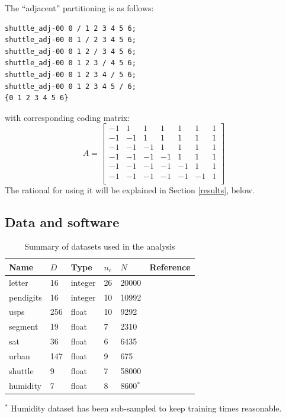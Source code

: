 The ``adjacent'' partitioning is as follows:
\begin{verbatim}
shuttle_adj-00 0 / 1 2 3 4 5 6;
shuttle_adj-00 0 1 / 2 3 4 5 6;
shuttle_adj-00 0 1 2 / 3 4 5 6;
shuttle_adj-00 0 1 2 3 / 4 5 6;
shuttle_adj-00 0 1 2 3 4 / 5 6;
shuttle_adj-00 0 1 2 3 4 5 / 6;
{0 1 2 3 4 5 6}
\end{verbatim}
with corresponding coding matrix:
\begin{equation}
A = 
\begin{bmatrix}
-1 & 1 & 1 & 1 & 1 & 1 & 1 \\
-1 & -1 & 1 & 1 & 1 & 1 & 1 \\
-1 & -1 & -1 & 1 & 1 & 1 & 1 \\
-1 & -1 & -1 & -1 & 1 & 1 & 1 \\
-1 & -1 & -1 & -1 & -1 & 1 & 1 \\
-1 & -1 & -1 & -1 & -1 & -1 & 1 \\
\end{bmatrix}
	\label{adjacent}
\end{equation}
The rational for using it will be explained in Section \ref{results}, below.

\subsection{Data and software}

\label{data_and_software}

\begin{table}
	\caption{Summary of datasets used in the analysis}\label{datasets}
	\begin{tabular}{|l|lllll|}
	\hline
	Name & $D$ & Type & $n_c$ & $N$ & Reference \\\hline \hline
	letter &  16 & integer & 26 & 20000 & {\small \citep{Frey_Slate1991}}\\
	pendigits & 16 & integer & 10 & 10992 & {\small \citep{Alimoglu1996}}\\
	usps & 256 & float & 10 & 9292 & {\small \citep{Hull1994}}\\
	segment & 19 & float & 7 & 2310 & {\small \citep{King_etal1995}} \\
	sat & 36 & float & 6 & 6435 & {\small \citep{King_etal1995}}\\
	urban & 147 & float & 9 & 675 & {\small \citep{Johnson2013}} \\
	shuttle & 9 & float & 7 & 58000 & {\small \citep{King_etal1995}}\\
	humidity & 7 & float & 8 & 8600$^*$ & {\small \citep{Mills2009}} \\
	\hline
\end{tabular}
	\vspace{1 ex}

	\raggedright $^*$ Humidity dataset has been sub-sampled to keep training times reasonable.
\end{table}

